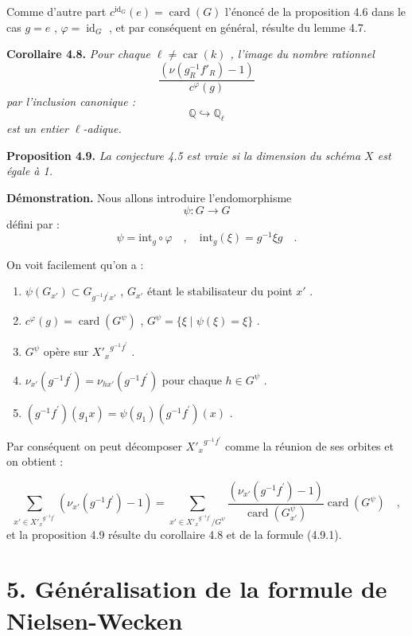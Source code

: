 \documentclass[11pt]{article}
\newcommand{\car}{\operatorname{car}}
\providecommand{\car}{\operatorname{car}}
\providecommand{\id}{\operatorname{id}}
\providecommand{\id}{\operatorname{id}}
\providecommand{\id}{\operatorname{id}}
\providecommand{\car}{\operatorname{car}}
\providecommand{\id}{\operatorname{id}}
\providecommand{\id}{\operatorname{id}}
\providecommand{\bQ}{\mathbb Q}
\providecommand{\card}{\operatorname{card}}
\providecommand{\car}{\operatorname{car}}
\providecommand{\id}{\operatorname{id}}
\begin{document}
Comme d'autre part $c^{\id_G}(e) = \card(G)$ l'énoncé de la proposition 4.6 dans le cas $g = e$ , $\varphi = \id_G$ , et par conséquent en général, résulte du lemme 4.7.

\medskip
\noindent
\textbf{Corollaire 4.8.} \emph{Pour chaque $\ell \neq \car(k)$ , l'image du nombre rationnel
\[
\frac{(\nu(g_R^{-1}f'_R) - 1)}{c^\varphi(g)}
\]
par l'inclusion canonique :
\[
\bQ \hookrightarrow \bQ_\ell
\]
est un entier $\ell$-adique.}

\medskip
\noindent
\textbf{Proposition 4.9.} \emph{La conjecture 4.5 est vraie si la dimension du schéma $X$ est égale à 1.}

\medskip

\noindent
\textbf{Démonstration.} Nous allons introduire l'endomorphisme
\[
\psi : G \longrightarrow G
\]
défini par :
\[
\psi = \mathrm{int}_g \circ \varphi \quad , \quad \mathrm{int}_g(\xi) = g^{-1}\xi g \quad .
\]

On voit facilement qu'on a :
\begin{enumerate}
\item[i)] $\psi(G_{x'}) \subset G_{g^{-1}f^{\prime}x'}$ , $G_{x'}$ étant le stabilisateur du point $x'$ .
\item[ii)] $c^\varphi(g) = \card(G^\psi)$ , $G^\psi = \{ \xi \mid \psi(\xi) = \xi \}$ .
\item[iii)] $G^\psi$ opère sur ${X'_x}^{g^{-1}f^{\prime}}$ .
\item[iv)] $\nu_{x'}(g^{-1}f^{\prime}) = \nu_{hx'}(g^{-1}f^{\prime})$ pour chaque $h \in G^\psi$ .
\item[v)] $(g^{-1}f^{\prime})(g_1x) = \psi(g_1)(g^{-1}f^{\prime})(x)$ .
\end{enumerate}

Par conséquent on peut décomposer ${X'_x}^{g^{-1}f^{\prime}}$ comme la réunion de ses orbites et on obtient :

\begin{equation}\tag{4.9.1}
\sum_{x' \in {X'_x}^{g^{-1}f^{\prime}}} (\nu_{x'}(g^{-1}f^{\prime}) - 1) = \sum_{x' \in {X'_x}^{g^{-1}f^{\prime}}/G^\psi} \frac{(\nu_{x'}(g^{-1}f^{\prime}) - 1)}{\card(G^\psi_{x'})} \card(G^\psi) \quad ,
\end{equation}
et la proposition 4.9 résulte du corollaire 4.8 et de la formule (4.9.1).


\section*{5. Généralisation de la formule de Nielsen-Wecken}
\end{document}
